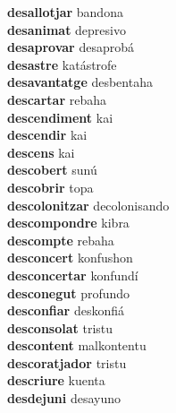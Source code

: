 \textbf{desallotjar } bandona \\
\textbf{desanimat } depresivo \\
\textbf{desaprovar } desaprobá \\
\textbf{desastre } katástrofe \\
\textbf{desavantatge } desbentaha \\
\textbf{descartar } rebaha \\
\textbf{descendiment } kai \\
\textbf{descendir } kai \\
\textbf{descens } kai \\
\textbf{descobert } sunú \\
\textbf{descobrir } topa \\
\textbf{descolonitzar } decolonisando \\
\textbf{descompondre } kibra \\
\textbf{descompte } rebaha \\
\textbf{desconcert } konfushon \\
\textbf{desconcertar } konfundí \\
\textbf{desconegut } profundo \\
\textbf{desconfiar } deskonfiá \\
\textbf{desconsolat } tristu \\
\textbf{descontent } malkontentu \\
\textbf{descoratjador } tristu \\
\textbf{descriure } kuenta \\
\textbf{desdejuni } desayuno \\
